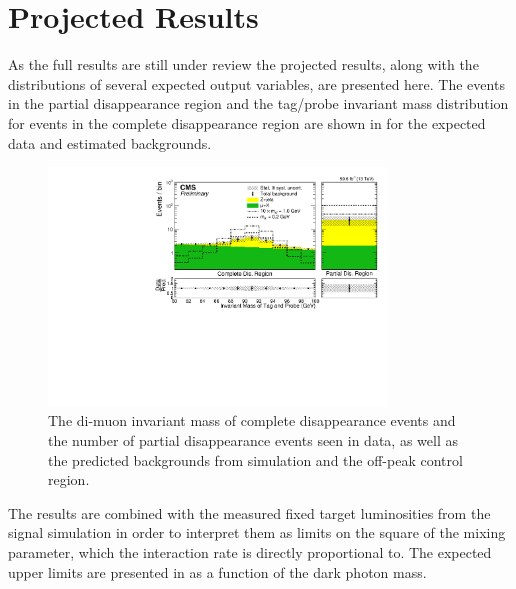 \chapter{Projected Results}
\label{results}
As the full results are still under review the projected results, along with the distributions of several expected output variables, are presented here.
The events in the partial disappearance region and the tag/probe invariant mass distribution for events in the complete disappearance region are shown in  for the expected data and estimated backgrounds.

\begin{figure}[htbp]
	\centering
	\includegraphics[width=0.8\textwidth]{figures/bdtScore_partialDisappearanceBDT_0p2.pdf}
	\caption[Observed Signal Region Events]{The di-muon invariant mass of complete disappearance events and the number of partial disappearance events seen in data, as well as the predicted backgrounds from simulation and the off-peak control region.}
	\label{fig:invMassResult}
\end{figure}

The results are combined with the measured fixed target luminosities from the signal simulation in order to interpret them as limits on the square of the mixing parameter, which the \dbrem interaction rate is directly proportional to.
The expected upper limits are presented in  as a function of the dark photon mass. 

